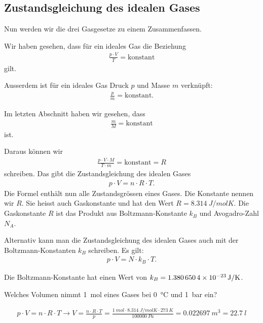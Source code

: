 \documentclass[12pt,a4paper,twoside]{article}
\begin{document}
\subsection*{Zustandsgleichung des idealen Gases}
Nun werden wir die drei Gasgesetze zu einem Zusammenfassen.

Wir haben gesehen, dass für ein ideales Gas die Beziehung
\begin{eqnarray*}
	\frac{p\cdot V}{T} = \text{konstant}
\end{eqnarray*}
gilt.

Ausserdem ist für ein ideales Gas Druck $p$ und Masse $m$ verknüpft:
\begin{eqnarray*}
	\frac{p}{m}=\text{konstant}\text{.}
\end{eqnarray*}

Im letzten Abschnitt haben wir gesehen, dass
\begin{eqnarray*}
	\frac{m}{M}= \text{konstant}
\end{eqnarray*}
ist.

Daraus können wir
\begin{eqnarray*}
	\frac{p\cdot V \cdot M}{T\cdot m} = \text{konstant} = R
\end{eqnarray*}
schreiben. 
Das gibt die Zustandsgleichung des idealen Gases
\begin{eqnarray*}
	p\cdot V=n\cdot R\cdot T\text{.}
\end{eqnarray*}
Die Formel enthält nun alle Zustandsgrössen eines Gases. Die Konstante nennen wir $R$.
Sie heisst auch Gaskonstante und hat den Wert $R=\SI{8.314}{J/mol K}$.
Die Gaskonstante $R$ ist das Produkt aus Boltzmann-Konstante $k_B$ und Avogadro-Zahl $N_A$. 

Alternativ kann man die Zustandsgleichung des idealen Gases auch mit der Boltzmann-Konstanten $k_B$ schreiben.
Es gilt:
\begin{eqnarray*}
	p\cdot V = N\cdot k_B\cdot T\text{.}
\end{eqnarray*}

Die Boltzmann-Konstante hat einen Wert von $k_B=\SI{1.3806504E-23}{J/K}$.

\begin{aufgabe}
	Welches Volumen nimmt \SI{1}{mol} eines Gases bei \SI{0}{\celsius} und \SI{1}{bar} ein?
	\begin{loesung}
		\begin{eqnarray*}
			p\cdot V=n\cdot R\cdot T \to V=\frac{n\cdot R\cdot T}{p}=\frac{\SI{1}{mol}\cdot\SI{8.314}{J/mol K}\cdot\SI{273}{K}}{\SI{100000}{Pa}}=\SI{0.022697}{m^3}=\SI{22.7}{l}
		\end{eqnarray*}
	\end{loesung}
\end{aufgabe}
\end{document}
